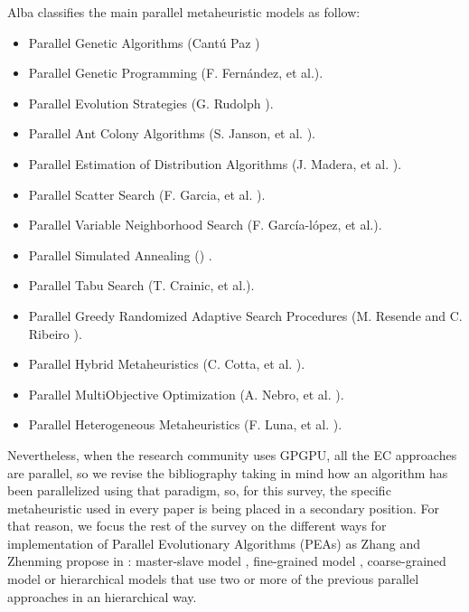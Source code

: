 \documentclass{comjnl}
\begin{document}
Alba classifies the main parallel metaheuristic models as follow:
\begin{itemize}
\item Parallel Genetic Algorithms (Cant\'u Paz \cite{Cantu-Paz98asurvey}) %
\item Parallel Genetic Programming (F. Fern\'andez, et al.\cite{springerlink:10.1023_A:1021873026259}).
\item Parallel Evolution Strategies (G. Rudolph \cite{Rudolph92parallelapproaches}).
\item Parallel Ant Colony Algorithms (S. Janson, et al. \cite{ParallelAntColony}).
\item Parallel Estimation of Distribution Algorithms (J. Madera, et al. \cite{springerlink:10.1007_3_540_32494_1_7}).
\item Parallel Scatter Search (F. Garcia, et al. \cite{GarciaLopez2003575}).
\item Parallel Variable Neighborhood Search (F. Garc\'ia-l\'opez, et al.\cite{Garcia_lopez_theparallel}).
\item Parallel Simulated Annealing (\cite{Genetic_parallelsimulated}) .
\item Parallel Tabu Search (T. Crainic, et al.\cite{Crainic97towardsa}).
\item Parallel Greedy Randomized Adaptive Search Procedures (M. Resende and C. Ribeiro \cite{Resendeparallelgreedy}).
\item Parallel Hybrid Metaheuristics (C. Cotta, et al. \cite{Cotta05e:parallel}). 
\item Parallel MultiObjective Optimization (A. Nebro, et al. \cite{Nebro07mocell:a}).
\item Parallel Heterogeneous Metaheuristics (F. Luna, et al. \cite{ANL04}). 
\end{itemize}

Nevertheless, when the research community uses GPGPU, all the EC approaches are parallel, so we revise the bibliography taking in mind how an algorithm has been parallelized using that paradigm, so, for this survey, the specific metaheuristic used in every paper is being placed in a secondary position.  For that reason, we focus the rest of the survey on the different ways for implementation of Parallel Evolutionary Algorithms (PEAs) as Zhang and Zhenming propose in \cite{ZhangImplementationMasterSlave}: master-slave model \cite{man-leung-wong-parallel-2005}, fine-grained model \cite{jian_ming_li_efficient_2007}, coarse-grained model \cite{Maitre:2009:CGP:1569901_1570089} \cite{pospichalParallelGeneticAlgorithOnCUDA2010} or hierarchical models  \cite{DBLP:conf/gecco/PospichalMOSJ11} that use two or more of the previous parallel approaches in an hierarchical way. 
 
\end{document}

